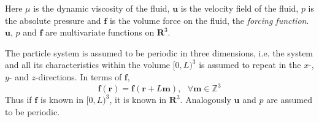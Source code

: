 \documentclass[a4paper,
twoside=false,abstract=false,numbers=noenddot,
titlepage=false,headings=small,parskip=half,version=last]{scrartcl}
\begin{document}
Here $\mu$ is the dynamic viscosity of the fluid, $\mathbf{u}$ is the velocity field of the fluid, $p$ is the absolute pressure and $\mathbf{f}$ is the volume force on the fluid, the \emph{forcing function}. $\mathbf{u}$, $p$ and $\mathbf{f}$ are multivariate functions on $\mathbf{R}^3$.

The particle system is assumed to be periodic in three dimensions, i.e. the system and all its characteristics within the volume $[0,L)^3$ is assumed to repeat in the $x$-,$y$- and $z$-directions.
In terms of $\mathbf{f}$,
\begin{equation}
\mathbf{f}(\mathbf{r}) = \mathbf{f}(\mathbf{r}+L\mathbf{m}),\text{ }\forall \mathbf{m} \in \mathbb{Z}^3
\end{equation}
Thus if $\mathbf{f}$ is known in $[0,L)^3$, it is known in $\mathbf{R}^3$. Analogously $\mathbf{u}$ and $p$ are assumed to be periodic.
\end{document}
